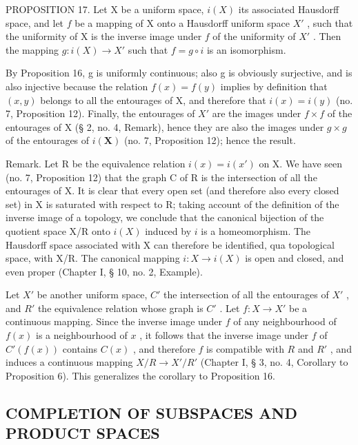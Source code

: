 PROPOSITION 17. Let X be a uniform space, \(i(X)\) its associated Hausdorff space, and let \(f\) be a mapping of X onto a Hausdorff uniform space \(X'\) , such that the uniformity of X is the inverse image under \(f\) of the uniformity of \(X'\) . Then the mapping \(g:i(X)\to X'\) such that \(f=g\circ i\) is an isomorphism.

By Proposition 16, g is uniformly continuous; also g is obviously surjective, and is also injective because the relation \(f(x) = f(y)\) implies by definition that \((x,y)\) belongs to all the entourages of X, and therefore that \(i(x)=i(y)\) (no. 7, Proposition 12). Finally, the entourages of \(X'\) are the images under \(f\times f\) of the entourages of X (§ 2, no. 4, Remark), hence they are also the images under \(g\times g\) of the entourages of \(i(\mathbf{X})\) (no. 7, Proposition 12); hence the result.

Remark. Let R be the equivalence relation \(i(x) = i(x')\) on X. We have seen (no. 7, Proposition 12) that the graph C of R is the intersection of all the entourages of X. It is clear that every open set (and therefore also every closed set) in X is saturated with respect to R; taking account of the definition of the inverse image of a topology, we conclude that the canonical bijection of the quotient space X/R onto \(i(X)\) induced by \(i\) is a homeomorphism. The Hausdorff space associated with X can therefore be identified, qua topological space, with X/R. The canonical mapping \(i: X \to i(X)\) is open and closed, and even proper (Chapter I, § 10, no. 2, Example).

Let \(X'\) be another uniform space, \(C'\) the intersection of all the entourages of \(X'\) , and \(R'\) the equivalence relation whose graph is \(C'\) . Let \(f: X \to X'\) be a continuous mapping. Since the inverse image under \(f\) of any neighbourhood of \(f(x)\) is a neighbourhood of \(x\) , it follows that the inverse image under \(f\) of \(C'(f(x))\) contains \(C(x)\) , and therefore \(f\) is compatible with \(R\) and \(R'\) , and induces a continuous mapping \(X/R \to X'/R'\) (Chapter I, § 3, no. 4, Corollary to Proposition 6). This generalizes the corollary to Proposition 16.

\subsection{COMPLETION OF SUBSPACES AND PRODUCT SPACES}


